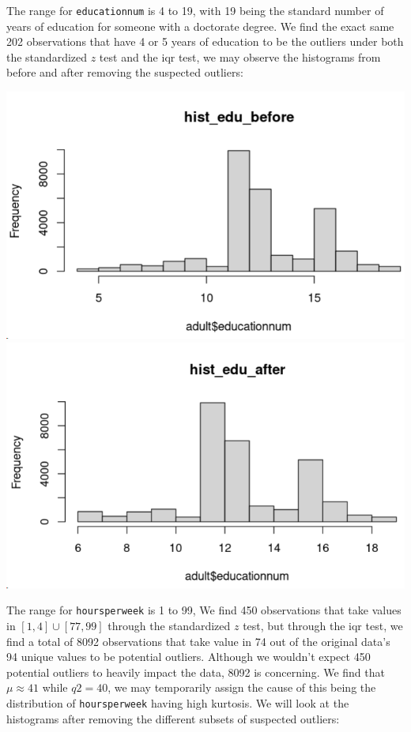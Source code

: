 \documentclass{article}
\begin{document}
    The range for \texttt{educationnum} is 4 to 19, with 19 being the standard number of years of education for someone with a doctorate degree. We find the exact same 202 observations that have 4 or 5 years of education to be the outliers under both the standardized $z$ test and the iqr test, we may observe the histograms from before and after removing the suspected outliers:
    \begin{center}
    \includegraphics[scale = 0.3]{hist_edu_before.png}
    \includegraphics[scale = 0.3]{hist_edu_after.png}
    \end{center}

    The range for \texttt{hoursperweek} is 1 to 99, We find 450 observations that take values in $[1, 4] \cup [77, 99]$ through the standardized $z$ test, but through the iqr test, we find a total of 8092 observations that take value in 74 out of the original data's 94 unique values to be potential outliers. Although we wouldn't expect 450 potential outliers to heavily impact the data, 8092 is concerning. We find that $\mu \approx 41$ while $q2 = 40$, we may temporarily assign the cause of this being the distribution of \texttt{hoursperweek} having high kurtosis. We will look at the histograms after removing the different subsets of suspected outliers:
\end{document}
